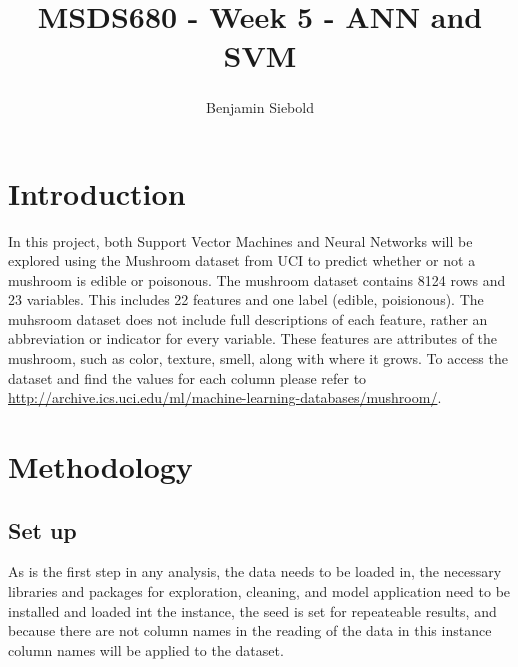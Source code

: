 \documentclass[
  english,
  man]{apa6}
\title{MSDS680 - Week 5 - ANN and SVM}
\author{Benjamin Siebold\textsuperscript{}}
\date{}
\affiliation{\vspace{0.5cm}\textsuperscript{} Regis University}
\begin{document}
\maketitle

\hypertarget{introduction}{%
\section{Introduction}\label{introduction}}

In this project, both Support Vector Machines and Neural Networks will be explored using the Mushroom dataset from UCI to predict whether or not a mushroom is edible or poisonous. The mushroom dataset contains 8124 rows and 23 variables. This includes 22 features and one label (edible, poisionous). The muhsroom dataset does not include full descriptions of each feature, rather an abbreviation or indicator for every variable. These features are attributes of the mushroom, such as color, texture, smell, along with where it grows. To access the dataset and find the values for each column please refer to \url{http://archive.ics.uci.edu/ml/machine-learning-databases/mushroom/}.

\hypertarget{methodology}{%
\section{Methodology}\label{methodology}}

\hypertarget{set-up}{%
\subsection{Set up}\label{set-up}}

As is the first step in any analysis, the data needs to be loaded in, the necessary libraries and packages for exploration, cleaning, and model application need to be installed and loaded int the instance, the seed is set for repeateable results, and because there are not column names in the reading of the data in this instance column names will be applied to the dataset.
\end{document}
